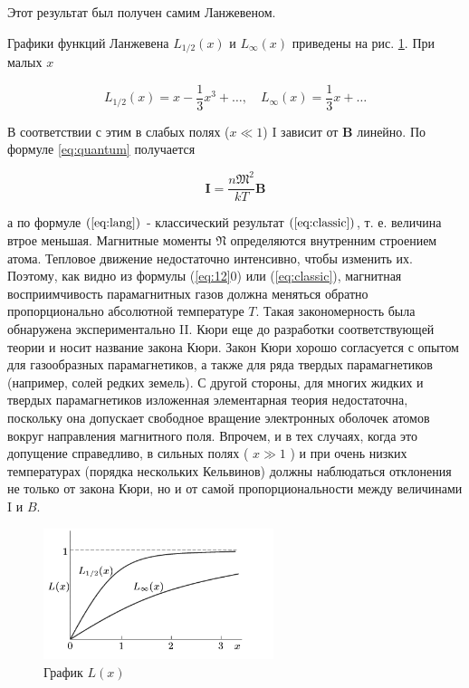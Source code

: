 \documentclass[12pt]{article}
\begin{document}
  Этот результат был получен самим Ланжевеном.

  Графики функций Ланжевена $L_{1 / 2}(x)$ и $L_{\infty}(x)$ приведены на рис. \ref{fig:175}. При малых $x$

  \begin{equation}
  L_{1 / 2}(x)=x-\frac{1}{3} x^3+\ldots, \quad L_{\infty}(x)=\frac{1}{3} x+\ldots
  \end{equation}

  В соответствии с этим в слабых полях ($x \ll 1$) I зависит от $\mathbf{B}$ линейно. По формуле \ref{eq:quantum} получается

  \begin{equation}
  \mathbf{I}=\frac{n \mathfrak{M}^2}{k T} \mathbf{B}
  \end{equation}

  а по формуле $(\ref{eq:lang})$ - классический результат $(\ref{eq:classic})$, т. е. величина втрое меньшая. Магнитные моменты $\mathfrak{N}$ определяются внутренним строением атома. Тепловое движение недостаточно интенсивно, чтобы изменить их. Поэтому, как видно из формулы (\ref{eq:12}0) или (\ref{eq:classic}), магнитная восприимчивость парамагнитных газов должна меняться обратно пропорционально абсолютной температуре $T$. Такая закономерность была обнаружена экспериментально II. Кюри еще до разработки соответствующей теории и носит название закона Кюри. Закон Кюри хорошо согласуется с опытом для газообразных парамагнетиков, а также для ряда твердых парамагнетиков (например, солей редких земель). С другой стороны, для многих жидких и твердых парамагнетиков изложенная элементарная теория недостаточна, поскольку она допускает свободное вращение электронных оболочек атомов вокруг направления магнитного поля. Впрочем, и в тех случаях, когда это
  допущение справедливо, в сильных полях ( $x \gg 1$ ) и при очень низких температурах (порядка нескольких Кельвинов) должны наблюдаться отклонения не только от закона Кюри, но и от самой пропорциональности между величинами I и $B$.

  \begin{figure}[H]
    \centering
    \includegraphics[width=0.6\textwidth]{graph.png}
    \caption{График $L(x)$}
    \label{fig:175}
  \end{figure}
\end{document}
